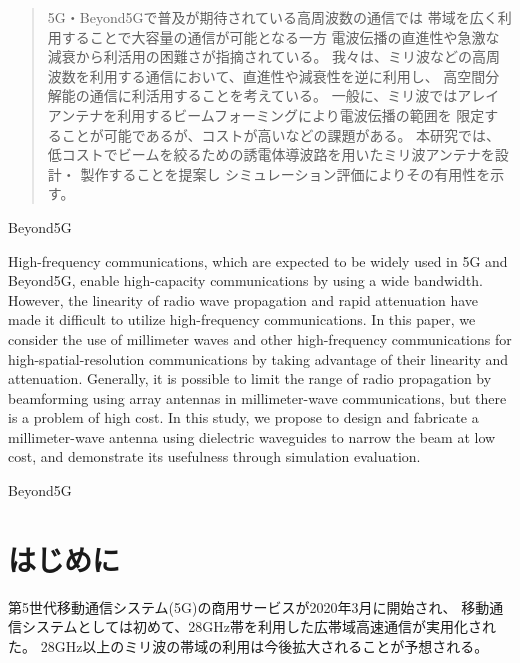 \documentclass[technicalreport]{ieicej}
\begin{document}
\begin{abstract}
  5G・Beyond5Gで普及が期待されている高周波数の通信では
  帯域を広く利用することで大容量の通信が可能となる一方
  電波伝播の直進性や急激な減衰から利活用の困難さが指摘されている。
  我々は、ミリ波などの高周波数を利用する通信において、直進性や減衰性を逆に利用し、
  高空間分解能の通信に利活用することを考えている。
  一般に、ミリ波ではアレイアンテナを利用するビームフォーミングにより電波伝播の範囲を
  限定することが可能であるが、コストが高いなどの課題がある。
  本研究では、低コストでビームを絞るための誘電体導波路を用いたミリ波アンテナを設計・
  製作することを提案し
  シミュレーション評価によりその有用性を示す。
\end{abstract}
\begin{keyword}
Beyond5G
\end{keyword}
\begin{eabstract}
High-frequency communications,
which are expected to be widely used in 5G and Beyond5G,
enable high-capacity communications by using a wide bandwidth.
However, the linearity of radio wave propagation and rapid attenuation
have made it difficult to utilize high-frequency communications.
In this paper, we consider the use of millimeter waves and
other high-frequency communications for high-spatial-resolution communications
by taking advantage of their linearity and attenuation.
Generally, it is possible to limit the range of radio propagation by
beamforming using array antennas in millimeter-wave communications,
but there is a problem of high cost.
In this study,
we propose to design and fabricate a millimeter-wave antenna using
dielectric waveguides to narrow the beam at low cost,
and demonstrate its usefulness through simulation evaluation.
\end{eabstract}
\begin{ekeyword}
Beyond5G
\end{ekeyword}
\maketitle

\section{はじめに}

第5世代移動通信システム(5G)の商用サービスが2020年3月に開始され、
移動通信システムとしては初めて、28GHz帯を利用した広帯域高速通信が実用化された。
28GHz以上のミリ波の帯域の利用は今後拡大されることが予想される。
\end{document}
